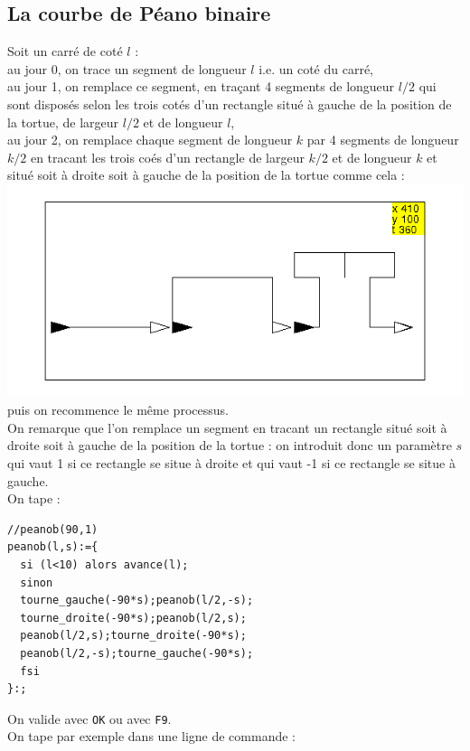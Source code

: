 \documentclass[a4paper,11pt]{book}
\begin{document}
\subsection{La courbe de P\'eano binaire}
Soit un carr\'e de cot\'e $l$ :\\
au jour 0, on trace un segment de longueur $l$ i.e. un cot\'e du carr\'e,\\
au jour 1, on remplace ce segment, en tra\c{c}ant 4 segments de longueur $l/2$ 
qui sont dispos\'es selon les trois cot\'es d'un rectangle situ\'e \`a gauche 
de la position de la tortue, de largeur $l/2$ et de longueur $l$,\\
au jour 2, on remplace chaque segment de longueur $k$ par 4 segments de 
longueur $k/2$ en tracant les trois 
co\'es d'un rectangle de largeur $k/2$ et de longueur $k$ et situ\'e soit 
\`a droite soit \`a gauche de la position de la tortue comme cela :\\
%
\includegraphics[width=\textwidth]{tortpeanob}\\
 puis on recommence le m\^eme processus.\\
On remarque que l'on remplace un segment en tracant un rectangle situ\'e soit 
\`a droite soit \`a gauche de la position de la tortue : on introduit donc un 
param\`etre $s$ qui vaut 1 si ce rectangle se situe \`a droite et qui vaut -1 
si ce rectangle se situe \`a gauche.\\ 
On tape :
\begin{verbatim}
//peanob(90,1)
peanob(l,s):={
  si (l<10) alors avance(l);
  sinon
  tourne_gauche(-90*s);peanob(l/2,-s);
  tourne_droite(-90*s);peanob(l/2,s);
  peanob(l/2,s);tourne_droite(-90*s);
  peanob(l/2,-s);tourne_gauche(-90*s);
  fsi
}:;
\end{verbatim}
On valide avec {\tt OK} ou avec {\tt F9}.\\
On tape par exemple dans une ligne de commande :\\
\end{document}
